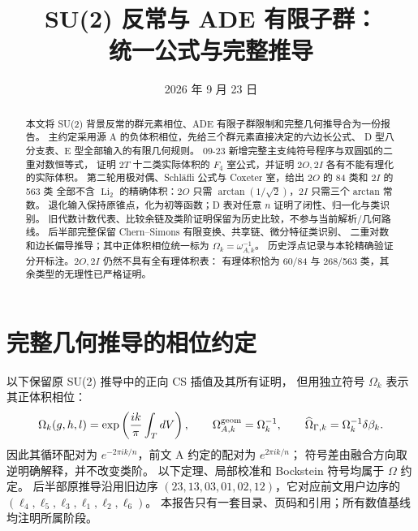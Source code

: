 \documentclass[UTF8,11pt,fontset=none]{ctexart}
\title{SU(2) 反常与 ADE 有限子群：\\统一公式与完整推导}
\author{}
\date{2026 年 9 月 23 日}
\numberwithin{equation}{section}
\theoremstyle{definition}
\DeclareMathOperator{\Li}{Li}
\begin{document}
\maketitle
\begin{abstract}
本文将 SU(2) 背景反常的群元素相位、ADE 有限子群限制和完整几何推导合为一份报告。
主约定采用源 A 的负体积相位，先给三个群元素直接决定的六边长公式、
D 型八分支表、E 型全部输入的有限几何规则。
09-23 新增完整主支纯符号程序与双圆弧的二重对数恒等式，
证明 $2T$ 十二类实际体积的 $F_4$ 室公式，并证明 $2O,2I$ 各有不能有理化的实际体积。
第二轮用极对偶、Schläfli 公式与 Coxeter 室，给出 $2O$ 的 84 类和 $2I$ 的 563 类
全部不含 $\Li_2$ 的精确体积：$2O$ 只需 $\arctan(1/\sqrt2)$，$2I$ 只需三个 arctan 常数。
退化输入保持原锥点，化为初等函数；D 表对任意 $n$ 证明了闭性、归一化与类识别。
旧代数计数代表、比较余链及类阶证明保留为历史比较，不参与当前解析/几何路线。
后半部完整保留 Chern--Simons 有限变换、共享链、微分特征类识别、
二重对数和边长偏导推导；其中正体积相位统一标为 $\Omega_k=\omega_{A,k}^{-1}$。
历史浮点记录与本轮精确验证分开标注。$2O,2I$ 仍然不具有全有理体积表：
有理体积恰为 60/84 与 268/563 类，其余类型的无理性已严格证明。
\end{abstract}
\tableofcontents
\clearpage

\clearpage
\section*{完整几何推导的相位约定}
以下保留原 SU(2) 推导中的正向 CS 插值及其所有证明，
但用独立符号 $\Omega_k$ 表示其正体积相位：
\[
\Omega_k(g,h,l)=\exp\left(\frac{ik}{\pi}\int_TdV\right),
\qquad \omega^{\rm geom}_{A,k}=\Omega_k^{-1},
\qquad \widehat\omega_{\Gamma,k}=\Omega_k^{-1}\delta\beta_k.
\]
因此其循环配对为 $e^{-2\pi ik/n}$，前文 A 约定的配对为 $e^{2\pi ik/n}$；
符号差由融合方向取逆明确解释，并不改变类阶。
以下定理、局部校准和 Bockstein 符号均属于 $\Omega$ 约定。
后半部原推导沿用旧边序 $(23,13,03,01,02,12)$，它对应前文用户边序的 $(\ell_4,\ell_5,\ell_3,\ell_1,\ell_2,\ell_6)$。
本报告只有一套目录、页码和引用；所有数值基线均注明所属阶段。
\begingroup
\let\omega\Omega

\endgroup
\end{document}

